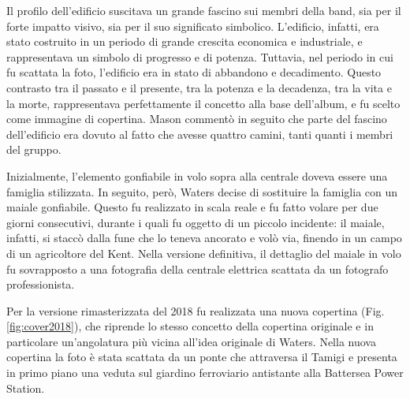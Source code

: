 \documentclass[class=book, crop=false, oneside, 12pt]{standalone}
\begin{document}
    Il profilo dell'edificio suscitava un grande fascino sui membri della band, sia per il forte impatto visivo, sia per il suo significato simbolico. L'edificio, infatti, era stato costruito in un periodo di grande crescita economica e industriale, e rappresentava un simbolo di progresso e di potenza. Tuttavia, nel periodo in cui fu scattata la foto, l'edificio era in stato di abbandono e decadimento. Questo contrasto tra il passato e il presente, tra la potenza e la decadenza, tra la vita e la morte, rappresentava perfettamente il concetto alla base dell'album, e fu scelto come immagine di copertina. Mason commentò in seguito che parte del fascino dell'edificio era dovuto al fatto che avesse quattro camini, tanti quanti i membri del gruppo.

    Inizialmente, l'elemento gonfiabile in volo sopra alla centrale doveva essere una famiglia stilizzata. In seguito, però, Waters decise di sostituire la famiglia con un maiale gonfiabile. Questo fu realizzato in scala reale e fu fatto volare per due giorni consecutivi, durante i quali fu oggetto di un piccolo incidente: il maiale, infatti, si staccò dalla fune che lo teneva ancorato e volò via, finendo in un campo di un agricoltore del Kent. Nella versione definitiva, il dettaglio del maiale in volo fu sovrapposto a una fotografia della centrale elettrica scattata da un fotografo professionista.
    
    Per la versione rimasterizzata del 2018 fu realizzata una nuova copertina (Fig.\ref{fig:cover2018}), che riprende lo stesso concetto della copertina originale e in particolare un'angolatura più vicina all'idea originale di Waters. Nella nuova copertina la foto è stata scattata da un ponte che attraversa il Tamigi e presenta in primo piano una veduta sul giardino ferroviario antistante alla Battersea Power Station.
\end{document}
